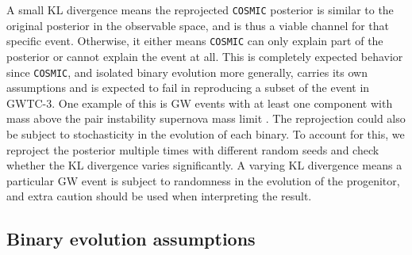 \documentclass[linenumbers,twocolumn]{aastex631}
\begin{document}
\noindent A small KL divergence means the reprojected \texttt{COSMIC} posterior
is similar to the original posterior in the observable space, and is thus a
viable channel for that specific event. Otherwise, it either means
\texttt{COSMIC} can only explain part of the posterior or cannot explain the
event at all. This is completely expected behavior since \texttt{COSMIC}, and
isolated binary evolution more generally, carries its own assumptions and is
expected to fail in reproducing a subset of the event in GWTC-3. One example of
this is GW events with at least one component with mass above the pair
instability supernova mass limit \citep{Woosley2017, Farmer2019}. The
reprojection could also be subject to stochasticity in the evolution of each
binary. To account for this, we reproject the posterior multiple times with
different random seeds and check whether the KL divergence varies significantly.
A varying KL divergence means a particular GW event is subject to randomness in
the evolution of the progenitor, and extra caution should be used when
interpreting the result.

\subsection{\textbf{Binary evolution assumptions}}
\label{subsec:binaries}
\end{document}
